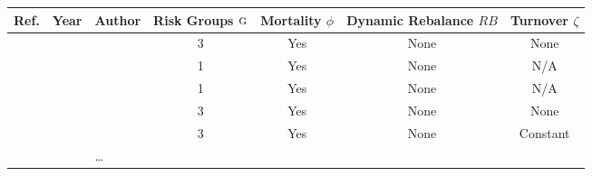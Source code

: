 \begin{tabular}{cllcccc}
	\toprule
	         Ref.           & Year                        & Author                        & Risk Groups $\textsc{g}$ & Mortality $\phi$ & Dynamic Rebalance $RB$ & Turnover $\zeta$ \\
	\midrule
	  \cite{Hallett2008}    & \citeyear{Hallett2008}      & \citeauthor{Hallett2008}      &        3         &       Yes        &          None          &       None       \\
	\cite{Barnighausen2012} & \citeyear{Barnighausen2012} & \citeauthor{Barnighausen2012} &        1         &       Yes        &          None          &       N/A        \\
	   \cite{Estill2012}    & \citeyear{Estill2012}       & \citeauthor{Estill2012}       &        1         &       Yes        &          None          &       N/A        \\
	   \cite{Cremin2013}    & \citeyear{Cremin2013}       & \citeauthor{Cremin2013}       &        3         &       Yes        &          None          &       None       \\
	   \cite{Eaton2014}     & \citeyear{Eaton2014}        & \citeauthor{Eaton2014}        &        3         &       Yes        &          None          &     Constant     \\
	                        &                             & \dots \\
	\bottomrule            
\end{tabular}
